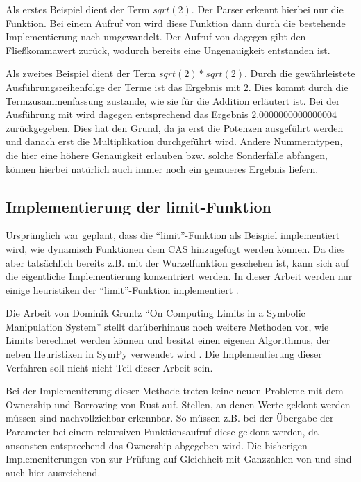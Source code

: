 \documentclass[11pt,a4paper, ngerman]{article}
\begin{document}
Als erstes Beispiel dient der Term $sqrt(2)$. Der Parser erkennt hierbei nur die Funktion. Bei einem Aufruf von  wird diese Funktion dann durch die bestehende Implementierung nach  umgewandelt. Der Aufruf von  dagegen gibt den Fließkommawert  zurück, wodurch bereits eine Ungenauigkeit entstanden ist.

Als zweites Beispiel dient der Term $sqrt(2)*sqrt(2)$. Durch die gewährleistete Ausführungsreihenfolge der Terme ist das Ergebnis mit  $2$. Dies kommt durch die Termzusammenfassung zustande, wie sie für die Addition erläutert ist. Bei der Ausführung mit  wird dagegen entsprechend das Ergebnis $2.0000000000000004$ zurückgegeben. Dies hat den Grund, da ja erst die Potenzen ausgeführt werden und danach erst die Multiplikation durchgeführt wird. Andere Nummerntypen, die hier eine höhere Genauigkeit erlauben bzw. solche Sonderfälle abfangen, können hierbei natürlich auch immer noch ein genaueres Ergebnis liefern.

\subsection{Implementierung der limit-Funktion}
Ursprünglich war geplant, dass die ``limit''-Funktion als Beispiel implementiert wird, wie dynamisch Funktionen dem CAS hinzugefügt werden können. Da dies aber tatsächlich bereits z.B. mit der Wurzelfunktion geschehen ist, kann sich auf die eigentliche Implementierung konzentriert werden. In dieser Arbeit werden nur einige heuristiken der ``limit''-Funktion implementiert \cite{ListLimitHeuristic}.

Die Arbeit von Dominik Gruntz ``On Computing Limits in a Symbolic Manipulation System'' \cite{GruntzPdf} stellt darüberhinaus noch weitere Methoden vor, wie Limits berechnet werden können und besitzt einen eigenen Algorithmus, der neben Heuristiken in SymPy verwendet wird \cite{SympyLimitNote}. Die Implementierung dieser Verfahren soll nicht nicht Teil dieser Arbeit sein.

Bei der Implemeniterung dieser Methode treten keine neuen Probleme mit dem Ownership und Borrowing von Rust auf. Stellen, an denen Werte geklont werden müssen sind nachvollziehbar erkennbar. So müssen z.B. bei der Übergabe der Parameter bei einem rekursiven Funktionsaufruf diese geklont werden, da ansonsten entsprechend das Ownership abgegeben wird. Die bisherigen Implemeniterungen von  zur Prüfung auf Gleichheit mit Ganzzahlen von  und  sind auch hier ausreichend.
\end{document}
